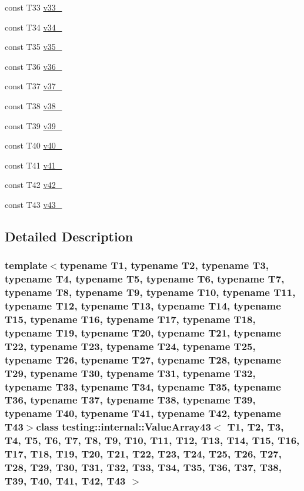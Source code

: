 \begin{DoxyCompactItemize}
\item 
const \-T33 \hyperlink{classtesting_1_1internal_1_1ValueArray43_a7a6cefe370b709c3a7b35b6d5ca8c778}{v33\-\_\-}
\item 
const \-T34 \hyperlink{classtesting_1_1internal_1_1ValueArray43_ab379e4d515d66bc57e05267515fab1d9}{v34\-\_\-}
\item 
const \-T35 \hyperlink{classtesting_1_1internal_1_1ValueArray43_a0a36112ac9b7a13572874977627ed192}{v35\-\_\-}
\item 
const \-T36 \hyperlink{classtesting_1_1internal_1_1ValueArray43_a531a52e3e8de6e982edd23c2547e4c49}{v36\-\_\-}
\item 
const \-T37 \hyperlink{classtesting_1_1internal_1_1ValueArray43_a2c4a91368c3edf933948acb4996a833d}{v37\-\_\-}
\item 
const \-T38 \hyperlink{classtesting_1_1internal_1_1ValueArray43_a364bf323d933a4adac3a9b46952ae1d3}{v38\-\_\-}
\item 
const \-T39 \hyperlink{classtesting_1_1internal_1_1ValueArray43_a0bd84ae118aa56fd251e494d1abc19fb}{v39\-\_\-}
\item 
const \-T40 \hyperlink{classtesting_1_1internal_1_1ValueArray43_ac99de9e6d59182db6141430e54f51e9c}{v40\-\_\-}
\item 
const \-T41 \hyperlink{classtesting_1_1internal_1_1ValueArray43_ad6f7550d60e8d13ade4c5033d07312e9}{v41\-\_\-}
\item 
const \-T42 \hyperlink{classtesting_1_1internal_1_1ValueArray43_a537a167baefbb86e0b3991dfd3d9437a}{v42\-\_\-}
\item 
const \-T43 \hyperlink{classtesting_1_1internal_1_1ValueArray43_a06f403913e68fabe63f09851fbdf196a}{v43\-\_\-}
\end{DoxyCompactItemize}


\subsection{\-Detailed \-Description}
\subsubsection*{template$<$typename T1, typename T2, typename T3, typename T4, typename T5, typename T6, typename T7, typename T8, typename T9, typename T10, typename T11, typename T12, typename T13, typename T14, typename T15, typename T16, typename T17, typename T18, typename T19, typename T20, typename T21, typename T22, typename T23, typename T24, typename T25, typename T26, typename T27, typename T28, typename T29, typename T30, typename T31, typename T32, typename T33, typename T34, typename T35, typename T36, typename T37, typename T38, typename T39, typename T40, typename T41, typename T42, typename T43$>$class testing\-::internal\-::\-Value\-Array43$<$ T1, T2, T3, T4, T5, T6, T7, T8, T9, T10, T11, T12, T13, T14, T15, T16, T17, T18, T19, T20, T21, T22, T23, T24, T25, T26, T27, T28, T29, T30, T31, T32, T33, T34, T35, T36, T37, T38, T39, T40, T41, T42, T43 $>$}



